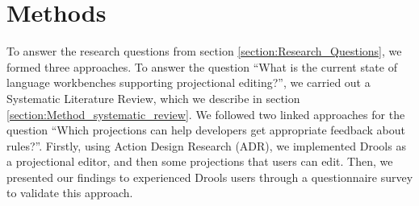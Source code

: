 \chapter{Methods}\label{chapter:Methods}

To answer the research questions from section \ref{section:Research_Questions}, we formed three approaches.
To answer the question ``What is the current state of language workbenches supporting projectional editing?'', we carried out a Systematic Literature Review, which we describe in section \ref{section:Method_systematic_review}.
We followed two linked approaches for the question ``Which projections can help developers get appropriate feedback about rules?''.
Firstly, using Action Design Research (ADR), we implemented Drools as a projectional editor, and then some projections that users can edit.
Then, we presented our findings to experienced Drools users through a questionnaire survey to validate this approach.


\newpage

\newpage
